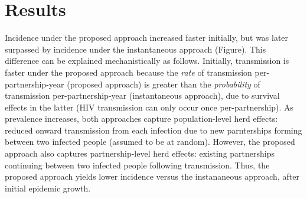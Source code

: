 \section{Results}
Incidence under the proposed approach increased faster initially,
but was later surpassed by incidence under the instantaneous approach (Figure).
This difference can be explained mechanistically as follows.
Initially, transmission is faster under the proposed approach
because the \emph{rate} of transmission per-partnership-year (proposed approach)
is greater than the \emph{probability} of transmission per-partnership-year (instantaneous approach),
due to survival effects in the latter (HIV transmission can only occur once per-partnership).
As prevalence increases, both approaches capture population-level herd effects:
reduced onward transmission from each infection due to
new parnterships forming between two infected people (assumed to be at random).
However, the proposed approach also captures partnership-level herd effects:
existing partnerships continuing between two infected people following transmission.
Thus, the proposed approach yields lower incidence versus the instananeous approach,
after initial epidemic growth.
